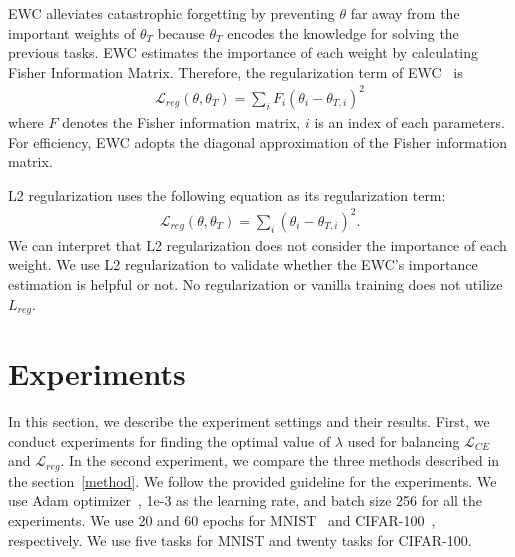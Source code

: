 \documentclass[final]{cvpr}
\begin{document}
EWC alleviates catastrophic forgetting by preventing $\theta$ far away from the important weights of $\theta_{T}$ because $\theta_{T}$ encodes the knowledge for solving the previous tasks. EWC estimates the importance of each weight by calculating Fisher Information Matrix. Therefore, the regularization term of EWC~\cite{ewc} is 
\begin{align}
	\mathcal{L}_{reg}(\theta, \theta_T) = \sum_i F_i(\theta_i - \theta_{T,i})^2
\end{align}
where $F$ denotes the Fisher information matrix, $i$ is an index of each parameters. For efficiency, EWC adopts the diagonal approximation of the Fisher information matrix.

L2 regularization uses the following equation as its regularization term:
\begin{align}
	\mathcal{L}_{reg}(\theta, \theta_T) = \sum_i(\theta_i - \theta_{T,i})^2.
\end{align}
We can interpret that L2 regularization does not consider the importance of each weight. We use L2 regularization to validate whether the EWC's importance estimation is helpful or not. No regularization or vanilla training does not utilize $L_{reg}$. 

\section{Experiments}
In this section, we describe the experiment settings and their results. First, we conduct experiments for finding the optimal value of $\lambda$ used for balancing $\mathcal{L}_{CE}$ and $\mathcal{L}_{reg}$. In the second experiment, we compare the three methods described in the section~\ref{method}. We follow the provided guideline for the experiments. We use Adam optimizer~\cite{adam}, 1e-3 as the learning rate, and batch size 256 for all the experiments. We use 20 and 60 epochs for MNIST~\cite{mnist} and CIFAR-100~\cite{cifar}, respectively. We use five tasks for MNIST and twenty tasks for CIFAR-100. 
\end{document}
